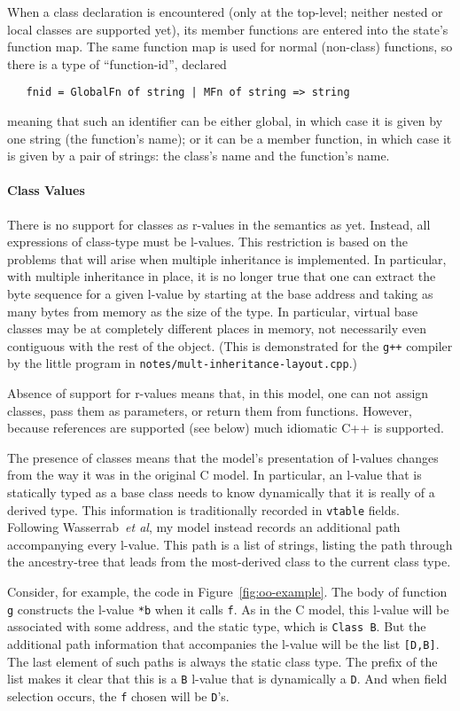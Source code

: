 \documentclass[11pt]{article}
\newcommand{\cpp}{\mbox{C\hspace{-0.5pt}+\hspace{-1.5pt}+}}
\begin{document}
When a class declaration is encountered (only at the top-level;
neither nested or local classes are supported yet), its member
functions are entered into the state's function map.  The same
function map is used for normal (non-class) functions, so there is a
type of ``function-id'', declared
\begin{verbatim}
   fnid = GlobalFn of string | MFn of string => string
\end{verbatim}
meaning that such an identifier can be either global, in which case it
is given by one string (the function's name); or it can be a member
function, in which case it is given by a pair of strings: the class's
name and the function's name.

\paragraph{Class Values}
There is no support for classes as r-values in the semantics as yet.
Instead, all expressions of class-type must be l-values.  This
restriction is based on the problems that will arise when multiple
inheritance is implemented.  In particular, with multiple inheritance
in place, it is no longer true that one can extract the byte sequence
for a given l-value by starting at the base address and taking as many
bytes from memory as the size of the type.  In particular, virtual
base classes may be at completely different places in memory, not
necessarily even contiguous with the rest of the object.  (This is
demonstrated for the \texttt{g++} compiler by the little program in
\texttt{notes/mult-inheritance-layout.cpp}.)

Absence of support for r-values means that, in this model, one can not
assign classes, pass them as parameters, or return them from
functions.  However, because references are supported (see below) much
idiomatic \cpp{} is supported.

The presence of classes means that the model's presentation of
l-values changes from the way it was in the original C model.  In
particular, an l-value that is statically typed as a base class needs
to know dynamically that it is really of a derived type.  This
information is traditionally recorded in \texttt{vtable} fields.
Following Wasserrab~\emph{et al}, my model instead records an
additional path accompanying every l-value.  This path is a list of
strings, listing the path through the ancestry-tree that leads from
the most-derived class to the current class type.

Consider, for example, the code in Figure~\ref{fig:oo-example}.  The
body of function \texttt{g} constructs the l-value \texttt{*b} when it
calls \texttt{f}.  As in the C model, this l-value will be associated
with some address, and the static type, which is \texttt{Class~B}.
But the additional path information that accompanies the l-value will
be the list \texttt{[D,B]}.  The last element of such paths is always
the static class type.  The prefix of the list makes it clear that
this is a \texttt{B} l-value that is dynamically a \texttt{D}.  And
when field selection occurs, the \texttt{f} chosen will be
\texttt{D}'s.
\end{document}
